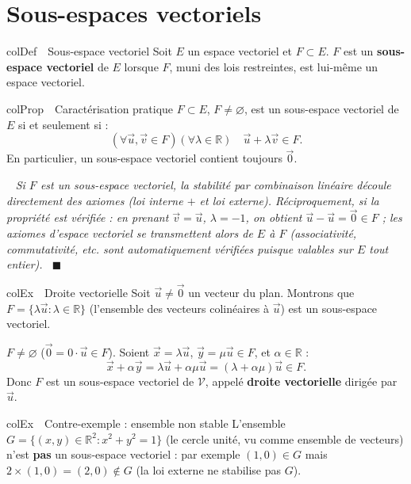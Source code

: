 \documentclass[11pt,a4paper]{article}
\newenvironment{definition}[1][Définition]
  {\begin{fiche}{colDef}{\ding{110}~~#1}}{\end{fiche}}
\newenvironment{propriete}[1][Propriété]
  {\begin{fiche}{colProp}{\ding{72}~~#1}}{\end{fiche}}
\newenvironment{exemple}[1][Exemple]
  {\begin{fiche}{colEx}{\ding{217}~~#1}}{\end{fiche}}
\newenvironment{demo}
  {\par\smallskip\noindent{\sffamily\bfseries\color{qtealdark}Démonstration.}\ \itshape}
  {\ \normalfont\hfill$\blacksquare$\par\medskip}
\begin{document}
\section{Sous-espaces vectoriels}

\begin{definition}[Sous-espace vectoriel]
Soit $E$ un espace vectoriel et $F\subset E$. $F$ est un \textbf{sous-espace vectoriel} de $E$ lorsque $F$, muni des lois restreintes, est lui-même un espace vectoriel.
\end{definition}

\begin{propriete}[Caractérisation pratique]
$F\subset E$, $F\ne\varnothing$, est un sous-espace vectoriel de $E$ si et seulement si :
\[
  (\forall \vec u,\vec v\in F)(\forall\lambda\in\mathbb{R})\quad \vec u+\lambda\vec v \in F.
\]
En particulier, un sous-espace vectoriel contient toujours $\vec0$.
\end{propriete}

\begin{demo}
Si $F$ est un sous-espace vectoriel, la stabilité par combinaison linéaire découle directement des axiomes (loi interne $+$ et loi externe). Réciproquement, si la propriété est vérifiée : en prenant $\vec v=\vec u$, $\lambda=-1$, on obtient $\vec u-\vec u=\vec0\in F$ ; les axiomes d'espace vectoriel se transmettent alors de $E$ à $F$ (associativité, commutativité, etc. sont automatiquement vérifiées puisque valables sur $E$ tout entier).
\end{demo}

\begin{exemple}[Droite vectorielle]
Soit $\vec u\ne\vec0$ un vecteur du plan. Montrons que $F=\{\lambda\vec u : \lambda\in\mathbb{R}\}$ (l'ensemble des vecteurs colinéaires à $\vec u$) est un sous-espace vectoriel.

\smallskip
$F\ne\varnothing$ ($\vec0=0\cdot\vec u\in F$). Soient $\vec x=\lambda\vec u$, $\vec y=\mu\vec u\in F$, et $\alpha\in\mathbb{R}$ :
\[
  \vec x+\alpha\vec y = \lambda\vec u+\alpha\mu\vec u = (\lambda+\alpha\mu)\vec u \in F.
\]
Donc $F$ est un sous-espace vectoriel de $\mathcal{V}$, appelé \textbf{droite vectorielle} dirigée par $\vec u$.
\end{exemple}

\begin{exemple}[Contre-exemple : ensemble non stable]
L'ensemble $G=\{(x,y)\in\mathbb{R}^2 : x^2+y^2=1\}$ (le cercle unité, vu comme ensemble de vecteurs) n'est \textbf{pas} un sous-espace vectoriel : par exemple $(1,0)\in G$ mais $2\times(1,0)=(2,0)\notin G$ (la loi externe ne stabilise pas $G$).
\end{exemple}
\end{document}
